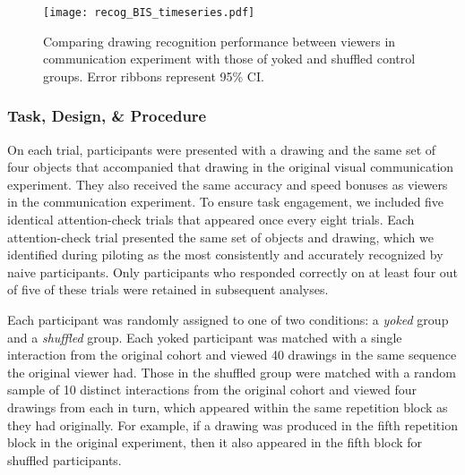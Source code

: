 \begin{figure}[t]
\begin{center}
\texttt{[image: recog\_BIS\_timeseries.pdf]}
\caption{Comparing drawing recognition performance between viewers in communication experiment with those of yoked and shuffled control groups. Error ribbons represent 95\% CI.}
\label{recog_bis}
\end{center}
\end{figure}


\subsubsection{Task, Design, \& Procedure}

On each trial, participants were presented with a drawing and the same set of four objects that accompanied that drawing in the original visual communication experiment.
They also received the same accuracy and speed bonuses as viewers in the communication experiment.
To ensure task engagement, we included five identical attention-check trials that appeared once every eight trials.
Each attention-check trial presented the same set of objects and drawing, which we identified during piloting as the most consistently and accurately recognized by naive participants.
Only participants who responded correctly on at least four out of five of these trials were retained in subsequent analyses.

Each participant was randomly assigned to one of two conditions: a \textit{yoked} group and a \textit{shuffled} group.
Each yoked participant was matched with a single interaction from the original cohort and viewed 40 drawings in the same sequence the original viewer had.
Those in the shuffled group were matched with a random sample of 10 distinct interactions from the original cohort and viewed four drawings from each in turn, which appeared within the same repetition block as they had originally.
For example, if a drawing was produced in the fifth repetition block in the original experiment, then it also appeared in the fifth block for shuffled participants.

